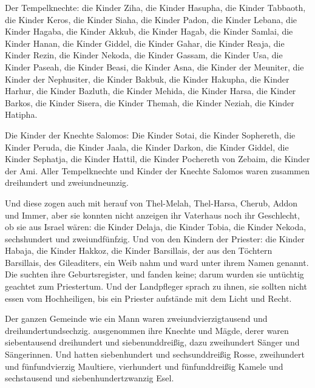  Der Tempelknechte: die Kinder Ziha, die Kinder Hasupha,
die Kinder Tabbaoth,  die Kinder Keros, die Kinder Siaha,
die Kinder Padon,  die Kinder Lebana, die Kinder Hagaba,
die Kinder Akkub,  die Kinder Hagab, die Kinder Samlai, die
Kinder Hanan,  die Kinder Giddel, die Kinder Gahar, die
Kinder Reaja,  die Kinder Rezin, die Kinder Nekoda, die
Kinder Gassam,  die Kinder Usa, die Kinder Paseah, die
Kinder Beasi,  die Kinder Asna, die Kinder der Meuniter,
die Kinder der Nephusiter,  die Kinder Bakbuk, die Kinder
Hakupha, die Kinder Harhur,  die Kinder Bazluth, die Kinder
Mehida, die Kinder Harsa,  die Kinder Barkos, die Kinder
Sisera, die Kinder Themah,  die Kinder Neziah, die Kinder
Hatipha.

 Die Kinder der Knechte Salomos: Die Kinder Sotai, die
Kinder Sophereth, die Kinder Peruda,  die Kinder Jaala, die
Kinder Darkon, die Kinder Giddel,  die Kinder Sephatja, die
Kinder Hattil, die Kinder Pochereth von Zebaim, die Kinder der Ami.
 Aller Tempelknechte und Kinder der Knechte Salomos waren
zusammen dreihundert und zweiundneunzig.

 Und diese zogen auch mit herauf von Thel-Melah,
Thel-Harsa, Cherub, Addon und Immer, aber sie konnten nicht anzeigen ihr
Vaterhaus noch ihr Geschlecht, ob sie aus Israel wären: 
die Kinder Delaja, die Kinder Tobia, die Kinder Nekoda, sechshundert und
zweiundfünfzig.  Und von den Kindern der Priester: die
Kinder Habaja, die Kinder Hakkoz, die Kinder Barsillais, der aus den
Töchtern Barsillais, des Gileaditers, ein Weib nahm und ward unter ihrem
Namen genannt.  Die suchten ihre Geburtsregister, und
fanden keine; darum wurden sie untüchtig geachtet zum Priestertum.
 Und der Landpfleger sprach zu ihnen, sie sollten nicht
essen vom Hochheiligen, bis ein Priester aufstände mit dem Licht und
Recht.

 Der ganzen Gemeinde wie ein Mann waren
zweiundvierzigtausend und dreihundertundsechzig. 
ausgenommen ihre Knechte und Mägde, derer waren siebentausend
dreihundert und siebenunddreißig, dazu zweihundert Sänger und
Sängerinnen.  Und hatten siebenhundert und sechsunddreißig
Rosse, zweihundert und fünfundvierzig Maultiere, 
vierhundert und fünfunddreißig Kamele und sechstausend und
siebenhundertzwanzig Esel.

